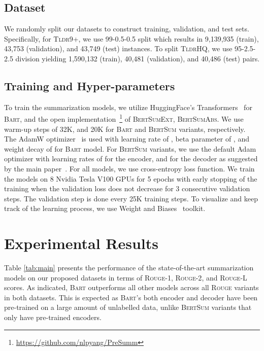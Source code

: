 \documentclass[11pt]{article}
\newcommand{\tldrl}{\textsc{Tldr9+}}
\newcommand{\tldrs}{\textsc{TldrHQ}}
\begin{document}
\subsection{Dataset}
We randomly split our datasets to construct training, validation, and test sets. Specifically, for \tldrl , we use 99-0.5-0.5 split which results in 9,139,935 (train), 43,753 (validation), and 43,749 (test) instances. To split \tldrs , we use 95-2.5-2.5 division yielding 1,590,132 (train), 40,481 (validation), and 40,486 (test) pairs.

\subsection{Training and Hyper-parameters}
To train the summarization models, we utilize HuggingFace's Transformers~\cite{Wolf2020Transformers} for \textsc{Bart}, and the open implementation~\footnote{\url{https://github.com/nlpyang/PreSumm}} of \textsc{BertSumExt}, \textsc{BertSumAbs}. We use warm-up steps of 32K, and 20K for \textsc{Bart} and \textsc{BertSum} variants, respectively. The AdamW optimizer~\cite{Loshchilov2019DecoupledWD} is used with learning rate of , beta parameter of , and weight decay of  for \textsc{Bart} model. For \textsc{BertSum} variants, we use the default Adam~\cite{Kingma2015AdamAM} optimizer with learning rates of  for the encoder, and  for the decoder as suggested by the main paper~\cite{Liu2019TextSW}. For all models, we use cross-entropy loss function. We train the models on 8 Nvidia Tesla V100 GPUs for 5 epochs with early stopping of the training when the validation loss does not decrease for 3 consecutive validation steps. The validation step is done every 25K training steps. To visualize and keep track of the learning process, we use Weight and Biases~\cite{wandb} toolkit.

 


\section{Experimental Results}
Table \ref{tab:main} presents the performance of the state-of-the-art summarization models on our proposed datasets in terms of \textsc{Rouge-1}, \textsc{Rouge-2}, and \textsc{Rouge-L} scores. As indicated, \textsc{Bart} outperforms all other models across all \textsc{Rouge} variants in both datasets. This is expected as \textsc{Bart}'s both encoder and decoder have been pre-trained on a large amount of unlabelled data, unlike \textsc{BertSum} variants that only have pre-trained encoders. 
\end{document}
